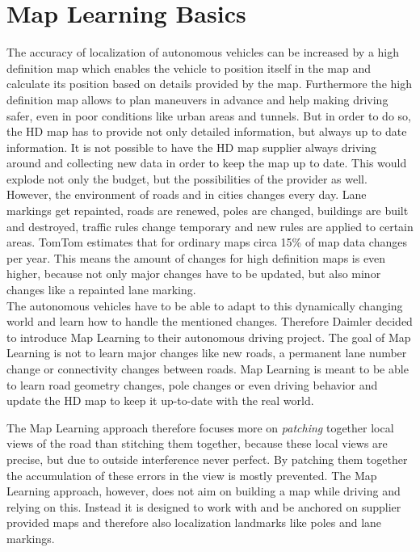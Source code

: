 \section{Map Learning Basics}
\label{ml_}
The accuracy of localization of autonomous vehicles can be increased by a high definition map which enables the vehicle to position itself in the map and calculate its position based on details provided by the map. Furthermore the high definition map allows to plan maneuvers in advance and help making driving safer, even in poor conditions like urban areas and tunnels. But in order to do so, the HD map has to provide not only detailed information, but always up to date information. It is not possible to have the HD map supplier always driving around and collecting new data in order to keep the map up to date. This would explode not only the budget, but the possibilities of the provider as well. However, the environment of roads and in cities changes every day. Lane markings get repainted, roads are renewed, poles are changed, buildings are built and destroyed, traffic rules change temporary and new rules are applied to certain areas. TomTom estimates that for ordinary maps circa 15\% of map data changes per year.\cite{tomtom} This means the amount of changes for high definition maps is even higher, because not only major changes have to be updated, but also minor changes like a repainted lane marking.\\
The autonomous vehicles have to be able to adapt to this dynamically changing world and learn how to handle the mentioned changes. Therefore Daimler decided to introduce Map Learning to their autonomous driving project. The goal of Map Learning is not to learn major changes like new roads, a permanent lane number change or connectivity changes between roads. Map Learning is meant to be able to learn road geometry changes, pole changes or even driving behavior and update the HD map to keep it up-to-date with the real world.\par
The Map Learning approach therefore focuses more on \emph{patching} together local views of the road than stitching them together, because these local views are precise, but due to outside interference never perfect. By patching them together the accumulation of these errors in the view is mostly prevented. The Map Learning approach, however, does not aim on building a map while driving and relying on this. Instead it is designed to work with and be anchored on supplier provided maps and therefore also localization landmarks like poles and lane markings.
